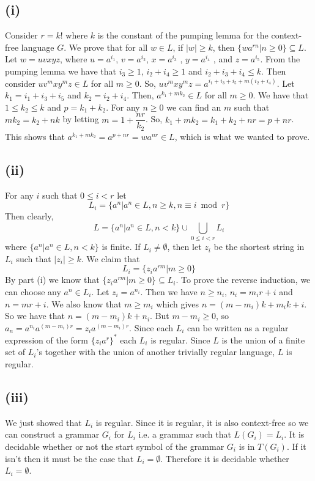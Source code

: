 \documentclass[12pt]{article}
\begin{document}
\subsection*{(i)} Consider $r = k!$ where $k$ is the constant of the pumping
lemma for the context-free language $G$. We prove that for all $w \in L$,
if $|w|\ge k$, then $\{wa^{rn} | n \ge 0 \} \subseteq L$. Let $w=uvxyz$, where
$u=a^{i_1}$, $v=a^{i_2}$, $x=a^{i_3}$ , $y=a^{i_4}$ , and $z=a^{i_5}$.
From the pumping lemma we have that $i_3 \ge 1$, $i_2 + i_4 \ge 1$ and
$i_2 + i_3 + i_4 \le k$. Then consider $uv^mxy^mz \in L$ for all $m \ge 0$.
So, $uv^mxy^mz = a^{i_1+i_3+i_5 + m(i_2 + i_4)}$. Let $k_1 = i_1 + i_3 + i_5$
and $k_2 = i_2 + i_4$. Then, $a^{k_1 + mk_2} \in L$ for all $m \ge 0$.
We have that $1 \le k_2 \le k$ and $p=k_1+k_2$. For any $n \ge 0$ we can find
an $m$ such that $mk_2=k_2 +nk$ by letting $m=1+ \dfrac{nr}{k_2}$. So,
$k_1+mk_2=k_1+k_2+nr=p+nr$. This shows that
$a^{k_1+mk_2}=a^{p+nr}=wa^{nr} \in L$, which is what we wanted to prove.

\subsection*{(ii)}
For any $i$ such that $0 \le i < r$ let
$$L_i = \{a^n |a^n \in L, n \ge k , n \equiv i \bmod r \}$$
Then clearly,
$$L = \{ a^n | a^n \in L , n < k\} \cup \bigcup_{0 \le i < r} L_i$$
where $\{ a^n | a^n \in L , n < k\}$ is finite.
If $L_i \neq \emptyset$, then let $z_i$ be the shortest string in $L_i$
such that $|z_i| \ge k$. We claim that
$$L_i = \{z_i a^{rm} | m \ge 0\}$$
By part (i) we know that $\{z_i a^{rm} | m \ge 0\} \subseteq L_i$.
To prove the reverse induction, we can choose any $a^n \in L_i$.
Let $z_i = a^{n_i}$. Then we have $n \ge n_i$, $n_i = m_ir + i$ and $n=mr +i$.
We also know that $m \ge m_i$ which gives $n=(m-m_i)k + m_ik + i$.
So we have that $n=(m-m_i)k + n_i$. But $m-m_i \ge 0$,
so $a_n=a^{n_i}a^{(m-m_i)r}=z_ia^{(m-m_i)r}$.
Since each $L_i$ can be written as a regular expression of the form
$\{z_ia^r\}^*$ each $L_i$ is regular. Since $L$ is the union of a finite set of
$L_i$'s together with the union of another trivially regular language,
$L$ is regular.

\subsection*{(iii)}
We just showed that $L_i$ is regular. Since it is regular, it is also
context-free so we can construct a grammar $G_i$ for $L_i$ i.e. a grammar such
that $L(G_i) = L_i$. It is decidable whether or not the start symbol of the
grammar $G_i$ is in $T(G_i)$. If it isn't then it must be the case that
$L_i = \emptyset$. Therefore it is decidable whether $L_i = \emptyset$.
\end{document}
